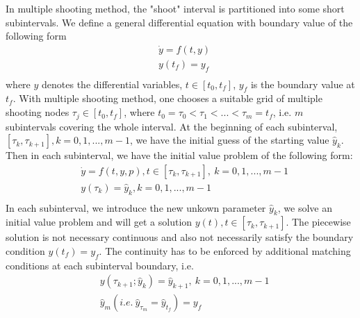 \documentclass  [
  paper    = a4,
  BCOR     = 10mm,
  twoside,
  fontsize = 12pt,
  fleqn,
  toc      = bibnumbered,
  toc      = listofnumbered,
  numbers  = noendperiod,
  headings = normal,
  listof   = leveldown,
  version  = 3.03
]                                       {scrreprt}
\newcommand{\<}{\langle}
\renewcommand{\>}{\rangle}
\begin{document}
In multiple shooting method, the "shoot" interval is partitioned into some short subintervals. We define a general differential equation with boundary value of the following form
\begin{equation}\label{eqn:ori_dae}
	\begin{aligned}
		& \dot{y} = f(t, y) \\ 
		& y(t_f) = y_f  \\
	\end{aligned}
\end{equation}
where $y$ denotes the differential variables, $t \in [t_0, t_f]$,  $y_f$ is the boundary value at $t_f$.  With multiple shooting method, one chooses a suitable grid of multiple shooting nodes $\tau_j \in [t_0,t_f] $, where $t_0 = \tau_0 < \tau_1 < ... < \tau_m = t_f$,  i.e. $m$ subintervals covering the whole interval. At the beginning of each subinterval, $[\tau_k, \tau_{k+1}], k = 0, 1, ..., m-1$, we have the initial guess of the starting value $\hat{y}_k$. Then in each subinterval, we have the initial value problem of the following form: 
\begin{equation}\label{eqn:msh}
	\begin{aligned}
		& \dot{y} = f(t, y, p) , t \in [\tau_k, \tau_{k+1}], \ k = 0, 1, ..., m-1   \\ 
		& y(\tau_k) = \hat{y}_k, k = 0, 1, ..., m-1  \\
	\end{aligned}
\end{equation}
In each subinterval, we introduce the new unkown parameter $\hat{y}_k$, we solve an initial value problem and will get a solution $y(t), t \in [\tau_k, \tau_{k+1}]$. The piecewise solution is not necessary continuous and also not necessarily satisfy the boundary condition $y(t_f) = y_f$. The continuity has to be enforced by additional matching conditions at each subinterval boundary, i.e. 
\begin{equation}\label{eqn:mc}
	\begin{aligned}
		& y(\tau_{k+1}; \hat{y}_k) = \hat{y}_{k+1}, \  k = 0, 1, ..., m-1  \\
		& \hat{y}_{m} (i.e. \ \hat{y}_{\tau_m} = \hat{y}_{t_f}) =  y_f 
	\end{aligned}
\end{equation}
\end{document}
